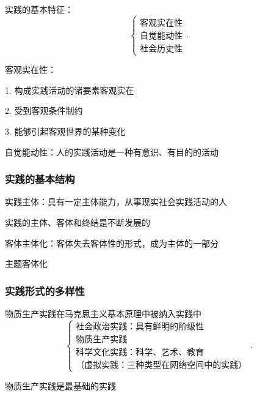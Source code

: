 实践的基本特征：
\[
    \begin{cases}
        \text{客观实在性}\\
        \text{自觉能动性}\\
        \text{社会历史性}
    \end{cases}
.\] 
\begin{notation}
    客观实在性：

    1. 构成实践活动的诸要素客观实在

    2. 受到客观条件制约

    3. 能够引起客观世界的某种变化
\end{notation}
\begin{notation}
    自觉能动性：人的实践活动是一种有意识、有目的的活动
\end{notation}
\subsubsection{实践的基本结构}%
\label{subsub:实践的基本结构}
\begin{defi}
    实践主体：具有一定主体能力，从事现实社会实践活动的人
\end{defi}
实践的主体、客体和终结是不断发展的
\begin{notation}
    客体主体化：客体失去客体性的形式，成为主体的一部分
\end{notation}
\begin{notation}
    主题客体化
\end{notation}
\subsubsection{实践形式的多样性}%
\label{subsub:实践形式的多样性}
物质生产实践在马克思主义基本原理中被纳入实践中
\[
    \begin{cases}
        \text{社会政治实践：具有鲜明的阶级性}\\
        \text{物质生产实践}\\
        \text{科学文化实践：科学、艺术、教育}\\
        \text{（虚拟实践：三种类型在网络空间中的实践）}
    \end{cases}
.\] 
\begin{notation}
    物质生产实践是最基础的实践
\end{notation}



